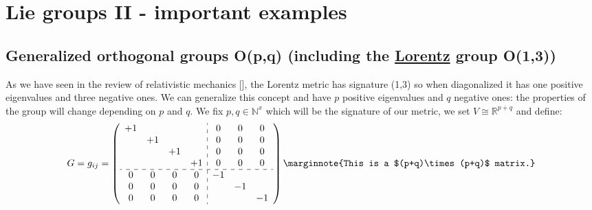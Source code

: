 \documentclass[../main.tex]{subfiles}
\begin{document}
\setchapterpreamble[u]{\margintoc}
\chapter[Lie groups II - important examples]{Lie groups II - important examples\footnotemark[0]}
\section{Generalized orthogonal groups O(p,q) (including the \href{https://it.wikipedia.org/wiki/Hendrik_Lorentz}{Lorentz} group O(1,3))}
As we have seen in the review of relativistic mechanics [], the Lorentz metric has signature (1,3) so when diagonalized it has one positive eigenvalues and three negative ones. We can generalize this concept and have $p$ positive eigenvalues and $q$ negative ones: the properties of the group will change depending on $p$ and $q$. We fix $p,q\in\mathbb{N}^x$ which will be the signature of our metric, we set $V\cong\mathbb{R}^{p+q}$ and define:
\[
G=g_{ij}=
\left(\begin{array}{cccc:ccc}
    +1&&& & 0&0&0 \\
    &+1&& & 0&0&0 \\
    &&+1& & 0&0&0 \\
    &&&+1 & 0&0&0 \\
    \hdashline
    0&0&0&0 & -1&&\\ 
    0&0&0&0 & &-1& \\
    0&0&0&0 & &&-1 \\
\end{array}\right)
\marginnote{This is a $(p+q)\times(p+q)$ matrix.}
\]
\end{document}
